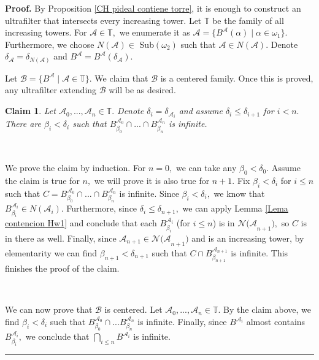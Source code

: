 \documentclass{article}%
\newtheorem{claim}[theorem]{Claim}
\newenvironment{proof}[1][Proof]{\noindent\textbf{#1.} }{\ \rule{0.5em}{0.5em}}
\begin{document}
\begin{proof}
By Proposition \ref{CH pideal contiene torre}, it is enough to construct an
ultrafilter that intersects every increasing tower. Let $\mathbb{T}$ be the
family of all increasing towers. For $\mathcal{A}\in\mathbb{T},$ we enumerate
it as $\mathcal{A}=\{B^{\mathcal{A}}\left(  \alpha\right)  \mid\alpha\in
\omega_{1}\}.$ Furthermore, we choose $N\left(  \mathcal{A}\right)  \in$
\textsf{Sub}$\left(  \omega_{2}\right)  $ such that $\mathcal{A}\in N\left(
\mathcal{A}\right)  .$ Denote $\delta_{\mathcal{A}}=\delta_{N\left(
\mathcal{A}\right)  }$ and $B^{\mathcal{A}}=B^{\mathcal{A}}(\delta
_{\mathcal{A}}).$

\qquad\qquad\qquad\qquad

Let $\mathcal{B=\{}B^{\mathcal{A}}\mid\mathcal{A\in\mathbb{T}\}}.$ We claim
that $\mathcal{B}$ is a centered family. Once this is proved, any ultrafilter
extending $\mathcal{B}$ will be as desired.

\begin{claim}
Let $\mathcal{A}_{0},...,\mathcal{A}_{n}\in\mathbb{T}.$ Denote $\delta
_{i}=\delta_{\mathcal{A}_{i}}$ and assume $\delta_{i}\leq\delta_{i+1}$ for
$i<n.$ There are $\beta_{i}<\delta_{i}$ such that $B_{\beta_{0}}%
^{\mathcal{A}_{0}}\cap...\cap B_{\beta_{n}}^{\mathcal{A}_{n}}$ is infinite.
\end{claim}

\qquad\ \qquad\ \ \ 

We prove the claim by induction. For $n=0,$ we can take any $\beta_{0}%
<\delta_{0}.$ Assume the claim is true for $n,$ we will prove it is also true
for $n+1.$ Fix $\beta_{i}<\delta_{i}$ for $i\leq n$ such that $C=B_{\beta_{0}%
}^{\mathcal{A}_{0}}\cap...\cap B_{\beta_{n}}^{\mathcal{A}_{n}}$ is infinite.
Since $\beta_{i}<\delta_{i},$ we know that $B_{\beta_{i}}^{\mathcal{A}_{i}}\in
N(\mathcal{A}_{i}).$ Furthermore, since $\delta_{i}\leq\delta_{n+1},$ we can
apply Lemma \ref{Lema contencion Hw1} and conclude that each $B_{\beta_{i}%
}^{\mathcal{A}_{i}}$ (for $i\leq n$) is in $\mathcal{N(A}_{n+1}\mathcal{)},$
so $C$ is in there as well. Finally, since $\mathcal{A}_{n+1}\in
\mathcal{N(A}_{n+1}\mathcal{)}$ and is an increasing tower, by elementarity we
can find $\beta_{n+1}<\delta_{n+1}$ such that $C\cap B_{\beta_{n+1}%
}^{\mathcal{A}_{n+1}}$ is infinite. This finishes the proof of the claim.

\qquad\qquad\ \ \ \qquad\ \ 

We can now prove that $\mathcal{B}$ is centered. Let $\mathcal{A}%
_{0},...,\mathcal{A}_{n}\in\mathbb{T}.$ By the claim above, we find $\beta
_{i}<\delta_{i}$ such that $B_{\beta_{0}}^{\mathcal{A}_{0}}\cap...B_{\beta
_{n}}^{\mathcal{A}_{n}}$ is infinite. Finally, since $B^{\mathcal{A}_{i}}$
almost contains $B_{\beta_{i}}^{\mathcal{A}_{i}},$ we conclude that
$\bigcap\limits_{i\leq n}B^{\mathcal{A}_{i}}$ is infinite.
\end{proof}
\end{document}
